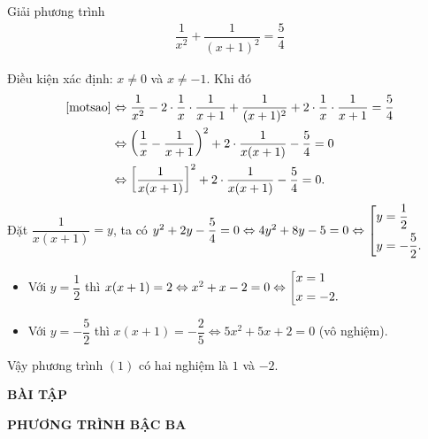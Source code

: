 	\begin{vd}
		Giải phương trình
		\begin{align*}
			\dfrac{1}{x^2} + \dfrac{1}{(x+1)^2} = \dfrac{5}{4} \tag{1*} \label{motsao}
		\end{align*}
		\loigiai 
		{
			Điều kiện xác định: $x \ne 0$ và $x \ne -1$. Khi đó
			\begin{align*}
				\eqref{motsao} &\Leftrightarrow \dfrac{1}{x^2} - 2 \cdot \dfrac{1}{x} \cdot \dfrac{1}{x+1} + \dfrac{1}{(x+1)^2} + 2 \cdot \dfrac{1}{x} \cdot \dfrac{1}{x+1} = \dfrac{5}{4} \\
				&\Leftrightarrow \left(\dfrac{1}{x} - \dfrac{1}{x+1}\right)^2 + 2 \cdot \dfrac{1}{x(x+1)} - \dfrac{5}{4} = 0 \\
				&\Leftrightarrow \left[\dfrac{1}{x(x+1)}\right]^2 + 2 \cdot \dfrac{1}{x(x+1)} - \dfrac{5}{4} = 0.
			\end{align*}
			Đặt $\dfrac{1}{x(x+1)} = y$, ta có $y^2 + 2y - \dfrac{5}{4} = 0 \Leftrightarrow 4y^2 + 8y - 5 = 0 \Leftrightarrow \left[\begin{aligned}&y=\dfrac{1}{2} \\ &y = - \dfrac{5}{2}.\end{aligned}\right.$
			\begin{itemize}
				\item Với $y = \dfrac{1}{2}$ thì $x(x+1)=2 \Leftrightarrow x^2 + x - 2 = 0 \Leftrightarrow \left[\begin{aligned}&x=1 \\ &x=-2.\end{aligned}\right.$
				\item Với $y = -\dfrac{5}{2}$ thì $x(x+1) = -\dfrac{2}{5} \Leftrightarrow 5x^2 + 5x + 2=0$ (vô nghiệm).
			\end{itemize}
			Vậy phương trình $(1)$ có hai nghiệm là $1$ và $-2$.
		}	
	\end{vd}
\begin{center}
	\large \textbf{BÀI TẬP}
\end{center}
\textbf{PHƯƠNG TRÌNH BẬC BA}
